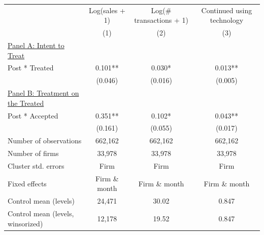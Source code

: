 \begin{tabular}[t]{lccc}
\toprule
  & Log(sales + 1) & Log(\# transactions + 1) & Continued using technology\\
& (1) & (2) & (3)\\
\toprule
\underline{Panel A: Intent to Treat} \\
Post * Treated & 0.101** & 0.030* & 0.013**\\
 & (0.046) & (0.016) & (0.005)\\
\underline{Panel B: Treatment on the Treated} \\
Post * Accepted & 0.351** & 0.102* & 0.043**\\
 & (0.161) & (0.055) & (0.017)\\
\midrule
Number of observations & 662,162 & 662,162 & 662,162\\
Number of firms & 33,978 & 33,978 & 33,978\\
Cluster std. errors & Firm & Firm & Firm\\
Fixed effects & Firm \& month & Firm \& month & Firm \& month\\
Control mean (levels) & 24,471 & 30.02 & 0.847\\
Control mean (levels, winsorized) & 12,178 & 19.52 & 0.847\\
\bottomrule
\end{tabular}

